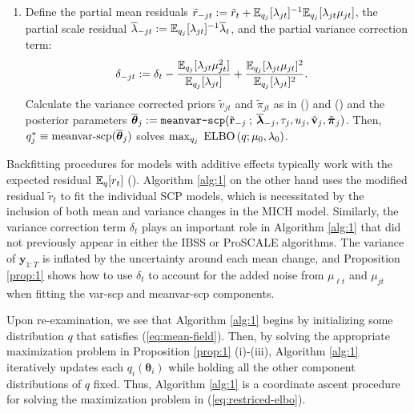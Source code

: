 \begin{proposition}
\begin{enumerate}[label=\roman*.]
    \item Define the partial mean residuals $\tilde{r}_{-jt} := \tilde{r}_{t} +\mathbb{E}_{q_j}[\lambda_{jt}]^{-1} \mathbb{E}_{q_j}[\lambda_{jt} \mu_{j t}]$, the partial scale residual $\overline{\lambda}_{-jt} := \mathbb{E}_{q_j}[\lambda_{j t}]^{-1}\overline{\lambda}_t$, and the partial variance correction term:
    \begin{align}
        \delta_{-jt} &:= \delta_t - \frac{\mathbb{E}_{q_j}[\lambda_{jt} \mu^2_{jt}]}{\mathbb{E}_{q_j}[\lambda_{jt}]} + \frac{\mathbb{E}_{q_j}[\lambda_{jt} \mu_{jt}]^2}{\mathbb{E}_{q_j}[\lambda_{jt}]^2}. \label{eq:delta_j}
    \end{align}
    Calculate the variance corrected priors $\tilde{v}_{jt}$ and $\tilde{\pi}_{jt}$ as in () and () and the posterior parameters $\overline{\boldsymbol{\theta}}_j := \normalfont{\texttt{meanvar-scp}}(\tilde{\mathbf{r}}_{-j} \:;\:\overline{\boldsymbol{\lambda}}_{-j}, \tau_j, u_j, \tilde{\mathbf{v}}_{j}, \tilde{\boldsymbol{\pi}}_j)$. Then, $q^*_j \equiv \text{\normalfont meanvar-scp}(\overline{\boldsymbol{\theta}}_j)$ solves $\max_{q_j}  \; \text{\normalfont ELBO}\left(q;\mu_0,\lambda_0\right)$.
\end{enumerate}
\end{proposition}
Backfitting procedures for models with additive effects typically work with the expected residual $\mathbb{E}_q[r_t]$ (\citealp{Breiman85,Hastie90,Friedman00,Wang20}). Algorithm \ref{alg:1} on the other hand uses the modified residual $\tilde{r}_t$ to fit the individual SCP models, which is necessitated by the inclusion of both mean and variance changes in the MICH model. Similarly, the variance correction term $\delta_t$ plays an important role in Algorithm \ref{alg:1} that did not previously appear in either the IBSS or ProSCALE algorithms. The variance of $\mathbf{y}_{1:T}$ is inflated by the uncertainty around each mean change, and Proposition \ref{prop:1} shows how to use $\delta_t$ to account for the added noise from $\mu_{\ell t}$ and $\mu_{j t}$ when fitting the var-scp and meanvar-scp components.

Upon re-examination, we see that Algorithm \ref{alg:1} begins by initializing some distribution $q$ that satisfies (\ref{eq:mean-field}). Then, by solving the appropriate maximization problem in Proposition \ref{prop:1} (i)-(iii), Algorithm \ref{alg:1} iteratively updates each $q_{i}(\boldsymbol{\theta}_{i})$ while holding all the other component distributions of $q$ fixed. Thus, Algorithm \ref{alg:1} is a coordinate ascent procedure for solving the maximization problem in (\ref{eq:restriced-elbo}).

